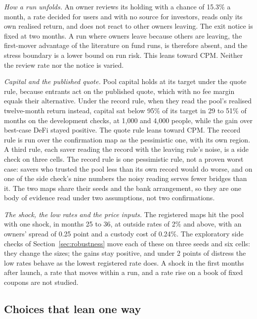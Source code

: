 \emph{How a run unfolds.} An owner reviews its holding with a chance of 15.3\% a month, a rate decided for users and
with no source for investors, reads only its own realised return, and does not react to other owners leaving. The
exit notice is fixed at two months. A run where owners leave because others are leaving, the first-mover
advantage of the literature on fund runs, is therefore absent, and the stress boundary is a lower
bound on run risk. This leans toward CPM. Neither the review rate nor the notice is varied.

\emph{Capital and the published quote.} Pool capital holds at its target under the quote rule, because entrants
act on the published quote, which with no fee margin equals their alternative. Under the record rule, when they
read the pool's realised twelve-month return instead, capital sat below 95\% of its target in 29 to 51\% of months on the development checks, at 1,000 and
4,000 people, while the gain over best-case DeFi stayed positive. The quote rule leans toward CPM. The record
rule is run over the confirmation map as the pessimistic one, with its own region. A third rule, each saver
reading the record with the leaving rule's noise, is a side check on three cells. The record rule is one
pessimistic rule, not a proven worst case: savers who trusted the pool less than its own record would do
worse, and on one of the side check's nine numbers the noisy reading serves fewer bridges than it. The two maps
share their seeds and the bank arrangement, so they are one body of evidence read under two
assumptions, not two confirmations.

\emph{The shock, the low rates and the price inputs.} The registered maps hit the pool with one shock, in months
25 to 36, at outside rates of 2\% and above, with an owners' spread of 0.25 point and a custody cost of 0.24\%.
The exploratory side checks of Section~\ref{sec:robustness} move each of these on three seeds and six cells: they
change the sizes; the gains stay positive, and under 2 points of distress the low rates behave as the lowest registered
rate does. A shock in the first months after launch, a rate that moves within a run,
and a rate rise on a book of fixed coupons are not studied.

\subsection{Choices that lean one way}

